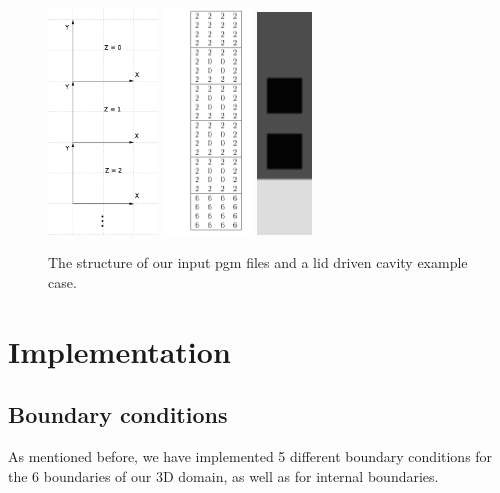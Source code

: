 \documentclass[a4paper, 12pt]{article}
\begin{document}
\begin{figure}[hb!]
\centering
\label{fig1}
\includegraphics[height=6cm]{coord.jpg}
\includegraphics[height=6cm]{cavity2.jpg}
\includegraphics[height=5.9cm]{cavity20202.jpg}
\caption{The structure of our input pgm files and a lid driven cavity example case.}
\end{figure}


\section{Implementation}\label{sec:implement}
\subsection{Boundary conditions}\label{sec:boundary_vel}
As mentioned before, we have implemented 5 different boundary conditions for the 6 boundaries of our 3D domain, as well as for internal boundaries.
\end{document}
